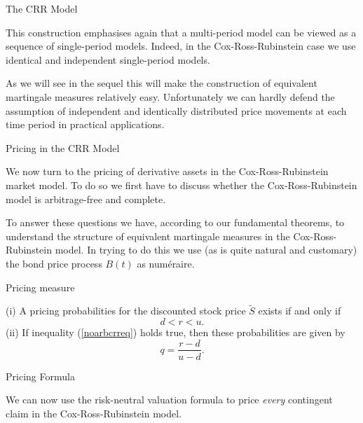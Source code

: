 { The CRR Model}


	This construction emphasises again that a multi-period model can
be viewed as a sequence of single-period models. Indeed, in the
Cox-Ross-Rubinstein case we use identical and independent
single-period models.

	As we will see in the sequel this will make
the construction of equivalent martingale measures relatively
easy. Unfortunately we can hardly defend the assumption of
independent and identically distributed price movements at each
time period in practical applications.



{Pricing in the CRR Model}


	We now turn to the pricing of derivative assets in the
Cox-Ross-Rubinstein market model. To do so we first have to
discuss whether the Cox-Ross-Rubinstein model is arbitrage-free
and complete.

	To answer these questions we have, according to our fundamental
theorems, to
understand the structure of equivalent martingale measures in the
Cox-Ross-Rubinstein model. In trying to do this we use (as is
quite natural and customary) the bond price process $B(t)$ as
num\'{e}raire.


{Pricing measure}

(i) A pricing probabilities for the discounted stock price
$\tilde{S}$ exists if and only if
\begin{equation}\label{noarbcrreq}
d < r < u.
\end{equation}
(ii) If inequality (\ref{noarbcrreq}) holds true, then these probabilities are given by
\begin{equation}\label{crrprob}
q=\frac{r-d}{u-d}.
\end{equation}

{Pricing Formula}


	We can now use the risk-neutral valuation formula to price {\it
every} contingent claim in the Cox-Ross-Rubinstein model.

